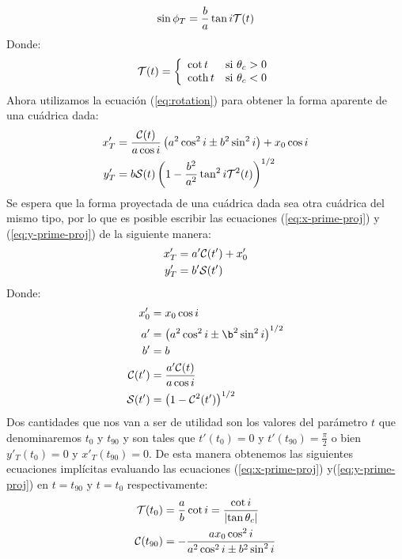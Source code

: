 \begin{align}
  \sin\phi_T = \frac{b}{a}\tan i\mathcal{T}(t) 
\end{align}
Donde:
\begin{align}
  \mathcal{T}(t) = \left\lbrace
  \begin{array}{lr}
    \cot t & \mathrm{si}~\theta_c > 0 \\
    \coth t & \mathrm{si}~\theta_c < 0 
  \end{array}
  \right.
\end{align}
Ahora utilizamos la ecuación (\ref{eq:rotation}) para obtener la forma aparente de una cuádrica dada:
\begin{align}
  x'_T &= \frac{\mathcal{C}(t)}{a\cos i}\left(a^2\cos^2 i \pm b^2\sin^2 i\right) + x_0\cos i
  \label{eq:x-prime-proj}\\
  y'_T &= b\mathcal{S}(t)\left(1 - \frac{b^2}{a^2}\tan^2 i\mathcal{T}^2(t)\right)^{1/2}
  \label{eq:y-prime-proj}
\end{align}
Se espera que la forma proyectada de una cuádrica dada sea otra cuádrica del mismo tipo, por lo que es posible escribir las ecuaciones (\ref{eq:x-prime-proj}) y (\ref{eq:y-prime-proj}) de la siguiente manera: 
\begin{align}
  x'_T &= a'\mathcal{C}(t') + x'_0 \label{eq:xtprime}\\
  y'_T &= b'\mathcal{S}(t') \label{eq:ytprime}
\end{align}
Donde:
\begin{align}
  x'_0 &= x_0\cos i \\
  a' &= \left(a^2\cos^2 i \pm \b^2\sin^2 i\right)^{1/2} \label{eq:a-prime}\\
  b' &= b \label{eq:b-prime}\\
  \Cos(t') &= \frac{a'\Cos(t)}{a\cos i} \\
  \Sin(t') &= \left(1 - \Cos^2(t')\right)^{1/2}
\end{align}
Dos cantidades que nos van a ser de utilidad son los valores del parámetro $t$ que denominaremos $t_0$ y $t_{90}$ y son tales que $t'(t_0) = 0$ y $t'(t_{90}) = \frac{\pi}{2}$ o bien $y'_T(t_0) = 0$ y $x'_T(t_{90}) = 0$. De esta manera obtenemos las siguientes ecuaciones implícitas evaluando las ecuaciones (\ref{eq:x-prime-proj}) y(\ref{eq:y-prime-proj}) en $t=t_{90}$ y $t=t_0$ respectivamente:
\begin{align}
  \mathcal{T}(t_0) &= \frac{a}{b}\cot{i} = \frac{\cot{i}}{\left|\tan\theta_c\right|} \label{eq:t0}\\
  \mathcal{C}(t_{90}) &= -\frac{ax_0\cos^2{i}}{a^2\cos^2{i}\pm b^2\sin^2{i}} \label{eq:t90}
\end{align}
